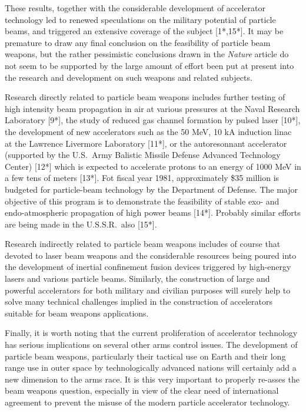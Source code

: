 \documentclass [12pt,a4paper,     ]{report} %
\begin{document}
   These results, together with the considerable development of accelerator technology led to renewed speculations on the military potential of particle beams, and triggered an extensive coverage of the subject [1*,15*].  It may be premature to draw any final conclusion on the feasibility of particle beam weapons, but the rather pessimistic conclusions drawn in the \emph{Nature} article do not seem to be supported by the large amount of effort been put at present into the research and development on such weapons and related subjects.

   Research directly related to particle beam weapons includes further testing of high intensity beam propagation in air at various pressures at the Naval Research Laboratory [9*], the study of reduced gas channel formation by pulsed laser [10*], the development of new accelerators such as the 50 MeV, 10 kA induction linac at the Lawrence Livermore Laboratory [11*], or the autoresonnant accelerator (supported by the U.S.\ Army Balistic Missile Defense Advanced Technology Center) [12*] which is expected to accelerate protons to an energy of 1000 MeV in a few tens of meters [13*].  Fot fiscal year 1981, approximately \$35 million is budgeted for particle-beam technology by the Department of Defense.  The major objective of this program is to demonstrate the feasibility of stable exo- and endo-atmospheric propagation of high power beams [14*].  Probably similar efforts are being made in the U.S.S.R.\ also [15*].

   Research indirectly related to particle beam weapons includes of course that devoted to laser beam weapons and the considerable resources being poured into the development of inertial confinement fusion devices triggered by high-energy lasers and various particle beams.  Similarly, the construction of large and powerful accelerators for both military and civilian purposes will surely help to solve many technical challenges implied in the construction of accelerators suitable for beam weapons applications.

   Finally, it is worth noting that the current proliferation of accelerator technology has serious implications on several other arms control issues.  The development of particle beam weapons, particularly their tactical use on Earth and their long range use in outer space by technologically advanced nations will certainly add a new dimension to the arms race.  It is this very important to properly re-asses the beam weapons question, especially in view of the clear need of international agreement to prevent the misuse of the modern particle accelerator technology.
\end{document}
